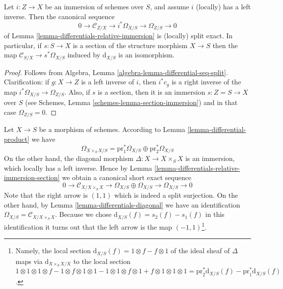 \begin{lemma}
\label{lemma-differentials-relative-immersion-section}
Let $i : Z \to X$ be an immersion of schemes over $S$, and
assume $i$ (locally) has a left inverse. Then the canonical
sequence
$$
0 \to \mathcal{C}_{Z/X} \to i^*\Omega_{X/S} \to \Omega_{Z/S} \to 0
$$
of
Lemma \ref{lemma-differentials-relative-immersion}
is (locally) split exact. In particular, if $s : S \to X$ is a section
of the structure morphism $X \to S$ then the map
$\mathcal{C}_{S/X} \to s^*\Omega_{X/S}$ induced by
$\text{d}_{X/S}$ is an isomorphism.
\end{lemma}

\begin{proof}
Follows from
Algebra, Lemma \ref{algebra-lemma-differential-seq-split}.
Clarification: if $g : X \to Z$ is a left inverse of $i$, then
$i^*c_g$ is a right inverse of the map $i^*\Omega_{X/S} \to \Omega_{Z/S}$.
Also, if $s$ is a section, then it is an immersion $s : Z = S \to X$
over $S$ (see
Schemes, Lemma \ref{schemes-lemma-section-immersion})
and in that case $\Omega_{Z/S} = 0$.
\end{proof}

\begin{remark}
\label{remark-differentials-diagonal}
Let $X \to S$ be a morphism of schemes. According to
Lemma \ref{lemma-differential-product}
we have
$$
\Omega_{X \times_S X/S} =
\text{pr}_1^*\Omega_{X/S} \oplus \text{pr}_2^*\Omega_{X/S}
$$
On the other hand, the diagonal morphism $\Delta : X \to X \times_S X$
is an immersion, which locally has a left inverse. Hence by
Lemma \ref{lemma-differentials-relative-immersion-section}
we obtain a canonical short exact sequence
$$
0 \to \mathcal{C}_{X/X \times_S X} \to \Omega_{X/S} \oplus \Omega_{X/S}
\to \Omega_{X/S} \to 0
$$
Note that the right arrow is $(1, 1)$ which is indeed a split surjection.
On the other hand, by Lemma \ref{lemma-differentials-diagonal}
we have an identification $\Omega_{X/S} = \mathcal{C}_{X/X \times_S X}$.
Because we chose $\text{d}_{X/S}(f) = s_2(f) - s_1(f)$ in this
identification it turns out that the left arrow is the map
$(-1, 1)$\footnote{Namely,
the local section $\text{d}_{X/S}(f) = 1 \otimes f - f \otimes 1$ of the
ideal sheaf of $\Delta$ maps via $\text{d}_{X \times_S X/X}$ to the
local section
$1 \otimes 1 \otimes 1 \otimes f - 1 \otimes f \otimes 1 \otimes 1
-1 \otimes 1 \otimes f \otimes 1 + f \otimes 1 \otimes 1 \otimes 1 =
\text{pr}_2^*\text{d}_{X/S}(f) - \text{pr}_1^*\text{d}_{X/S}(f)$.}.
\end{remark}

